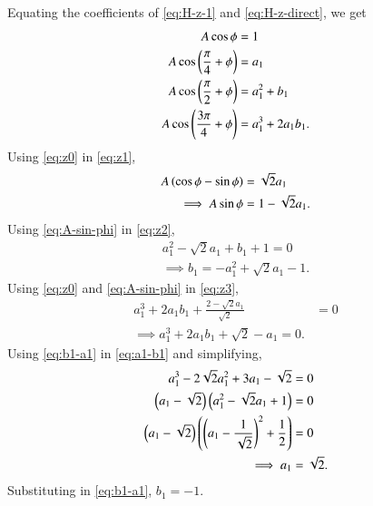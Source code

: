 \documentclass[journal,12pt,twocolumn]{IEEEtran}
\begin{document}
\begin{enumerate}[label=\theenumi.]
\begin{enumerate}
                Equating the coefficients of \eqref{eq:H-z-1} and
                \eqref{eq:H-z-direct}, we get
                \begin{align}
                    A\cos\phi &= 1 \label{eq:z0} \\
                    A\cos\left(\frac{\pi}{4}+\phi\right) &= a_1 \label{eq:z1} \\
                    A\cos\left(\frac{\pi}{2}+\phi\right) &= a_1^2 + b_1 \label{eq:z2} \\
                    A\cos\left(\frac{3\pi}{4}+\phi\right) &= a_1^3 + 2a_1b_1. \label{eq:z3}
                \end{align}
                Using \eqref{eq:z0} in \eqref{eq:z1},
                \begin{align}
                    A\left(\cos\phi - \sin\phi\right) &= \sqrt{2}a_1 \\
                    \implies A\sin\phi &= 1 - \sqrt{2}a_1.
                    \label{eq:A-sin-phi}
                \end{align}
                Using \eqref{eq:A-sin-phi} in \eqref{eq:z2},
                \begin{align}
                    a_1^2 - \sqrt{2}a_1 + b_1 + 1 = 0 \\
                    \implies b_1 = -a_1^2 + \sqrt{2}a_1 - 1.
                    \label{eq:b1-a1}
                \end{align}
                Using \eqref{eq:z0} and \eqref{eq:A-sin-phi} in \eqref{eq:z3},
                \begin{align}
                    a_1^3 + 2a_1b_1 + \frac{2 - \sqrt{2}a_1}{\sqrt{2}} &= 0 \\
                    \implies a_1^3 + 2a_1b_1 + \sqrt{2} - a_1 = 0.
                    \label{eq:a1-b1}
                \end{align}
                Using \eqref{eq:b1-a1} in \eqref{eq:a1-b1} and simplifying,
                \begin{align}
                    a_1^3 - 2\sqrt{2}a_1^2 + 3a_1 - \sqrt{2} &= 0 \\
                    \left(a_1-\sqrt{2}\right)\left(a_1^2-\sqrt{2}a_1+1\right) &= 0 \\
                    \left(a_1-\sqrt{2}\right)\left(\left(a_1-\frac{1}{\sqrt{2}}\right)^2+\frac{1}{2}\right) &= 0 \\
                    \implies a_1 &= \sqrt{2}. \label{eq:sol-a1}
                \end{align}
                Substituting in \eqref{eq:b1-a1}, \(b_1 = -1\).


\end{enumerate}
\end{enumerate}
\end{document}
